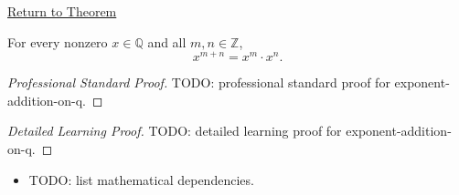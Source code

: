 \newpage
{}
\label{prf:exponent-addition-on-q}

\begin{remark*}[Return]
\hyperref[cor:exponent-addition-on-q]{Return to Theorem}
\end{remark*}

\begin{corollary*}
For every nonzero $x\in\mathbb{Q}$ and all $m,n\in\mathbb{Z}$,
\[
x^{m+n}=x^m\cdot x^n.
\]
\end{corollary*}

\begin{proof}[Professional Standard Proof]
\LRAProofBodyStart
TODO: professional standard proof for exponent-addition-on-q.
\end{proof}

\begin{proof}[Detailed Learning Proof]
\LRAProofBodyStart
TODO: detailed learning proof for exponent-addition-on-q.
\end{proof}

\begin{remark*}
\end{remark*}

\begin{dependencies}
\begin{itemize}
  \item TODO: list mathematical dependencies.
\end{itemize}
\end{dependencies}

\clearpage
